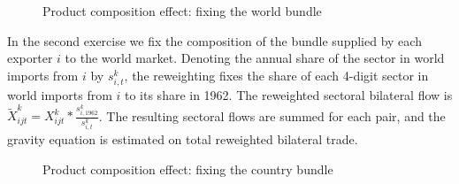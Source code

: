 \documentclass[12pt,twoside,a4paper,notitlepage]{article}
\begin{document}
\begin{figure}[h!]
\caption{Product composition effect: fixing the world bundle  \label{fig:compworld}}
\begin{center}
\setlength{\fboxrule}{1pt} %
\setlength{\fboxsep}{.1in} %
\end{center}
\end{figure}

In the second exercise we fix the composition of the bundle supplied by each exporter $i$ to the world market. Denoting the annual share of the sector in world imports from $i$ by $s^{k}_{i,t}$, the reweighting fixes the share of each 4-digit sector in world imports from $i$ to its share in 1962. The reweighted sectoral bilateral flow is $\tilde{X}^k_{ijt}=X^k_{ijt}*\frac{s^k_{i,1962}}{s^k_{i,t}}$. The resulting sectoral flows are summed for each pair, and the gravity equation is estimated on total reweighted bilateral trade.

\begin{figure}[h!]
\caption{Product composition effect: fixing the country bundle  \label{fig:compbundle}}
\begin{center}
\setlength{\fboxrule}{1pt} %
\setlength{\fboxsep}{.1in} %
\end{center}
\end{figure}
\end{document}
